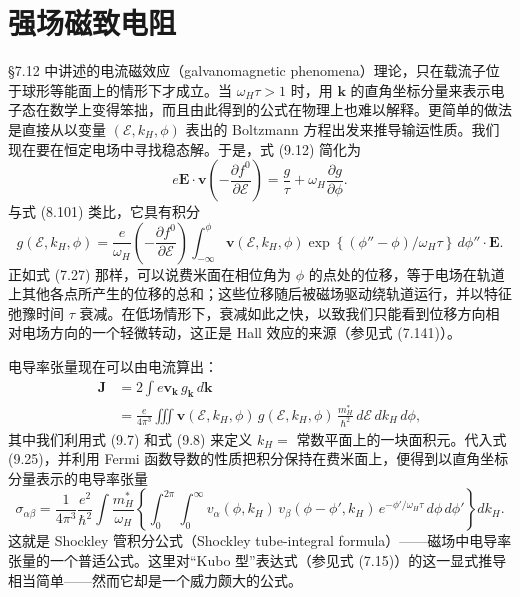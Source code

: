 \section{强场磁致电阻}

§7.12 中讲述的电流磁效应（galvanomagnetic phenomena）理论，只在载流子位于球形等能面上的情形下才成立。当 $\omega_H\tau>1$ 时，用 $\mathbf{k}$ 的直角坐标分量来表示电子态在数学上变得笨拙，而且由此得到的公式在物理上也难以解释。更简单的做法是直接从以变量 $(\mathcal{E},k_H,\phi)$ 表出的 Boltzmann 方程出发来推导输运性质。我们现在要在恒定电场中寻找稳态解。于是，式 (9.12) 简化为
\begin{equation*}
e\mathbf{E}\cdot\mathbf{v}\left(-\frac{\partial f^{0}}{\partial\mathcal{E}}\right)=\frac{g}{\tau}+\omega_H\frac{\partial g}{\partial\phi}. \tag{9.24}
\end{equation*}
与式 (8.101) 类比，它具有积分
\begin{equation*}
g(\mathcal{E},k_H,\phi)=\frac{e}{\omega_H}\left(-\frac{\partial f^{0}}{\partial\mathcal{E}}\right)\int_{-\infty}^{\phi}\mathbf{v}(\mathcal{E},k_H,\phi)\exp\left\{(\phi''-\phi)/\omega_H\tau\right\}\,d\phi''\cdot\mathbf{E}. \tag{9.25}
\end{equation*}
正如式 (7.27) 那样，可以说费米面在相位角为 $\phi$ 的点处的位移，等于电场在轨道上其他各点所产生的位移的总和；这些位移随后被磁场驱动绕轨道运行，并以特征弛豫时间 $\tau$ 衰减。在低场情形下，衰减如此之快，以致我们只能看到位移方向相对电场方向的一个轻微转动，这正是 Hall 效应的来源（参见式 (7.141)）。

电导率张量现在可以由电流算出：
\begin{align*}
\mathbf{J}&=2\int e\mathbf{v}_{\mathbf{k}}\,g_{\mathbf{k}}\,d\mathbf{k}\\
&=\frac{e}{4\pi^{3}}\iiint \mathbf{v}(\mathcal{E},k_H,\phi)\,g(\mathcal{E},k_H,\phi)\,\frac{m_H^{*}}{\hbar^{2}}\,d\mathcal{E}\,dk_H\,d\phi, \tag{9.26}
\end{align*}
其中我们利用式 (9.7) 和式 (9.8) 来定义 $k_H=$ 常数平面上的一块面积元。代入式 (9.25)，并利用 Fermi 函数导数的性质把积分保持在费米面上，便得到以直角坐标分量表示的电导率张量
\begin{equation*}
\sigma_{\alpha\beta}=\frac{1}{4\pi^{3}}\frac{e^{2}}{\hbar^{2}}\int\frac{m_H^{*}}{\omega_H}\left\{\int_{0}^{2\pi}\int_{0}^{\infty}v_{\alpha}(\phi,k_H)\,v_{\beta}(\phi-\phi',k_H)\,e^{-\phi'/\omega_H\tau}\,d\phi\,d\phi'\right\}dk_H. \tag{9.27}
\end{equation*}
这就是 Shockley 管积分公式（Shockley tube-integral formula）——磁场中电导率张量的一个普适公式。这里对“Kubo 型”表达式（参见式 (7.15)）的这一显式推导相当简单——然而它却是一个威力颇大的公式。

